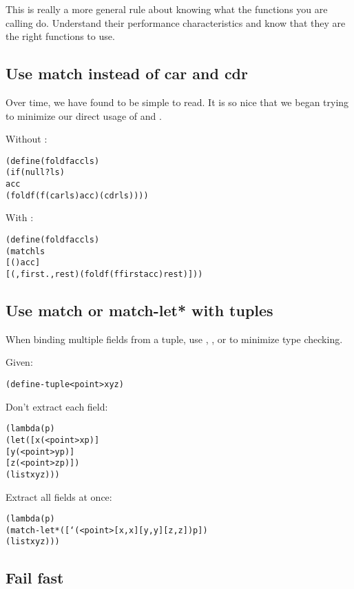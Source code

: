 \documentclass[letterpaper,11pt,twoside,final]{article}
\begin{document}
This is really a more general rule about knowing what the functions
you are calling do. Understand their performance characteristics and
know that they are the right functions to use.

\subsection* {Use match instead of car and cdr}

Over time, we have found  to be simple to read. It is
so nice that we began trying to minimize our direct usage of
 and .

Without :
\antipar
\begin{alltt}
(define (fold f acc ls)
  (if (null? ls)
      acc
      (fold f (f (car ls) acc) (cdr ls))))
\end{alltt}

With :
\antipar
\begin{alltt}
(define (fold f acc ls)
  (match ls
    [() acc]
    [(,first . ,rest) (fold f (f first acc) rest)]))
\end{alltt}

\subsection* {Use match or match-let* with tuples}

When binding multiple fields from a tuple, use ,
, or
 to minimize type checking.

Given:
\antipar
\begin{alltt}
(define-tuple <point> x y z)
\end{alltt}

Don't extract each field:
\antipar
\begin{alltt}
(lambda (p)
  (let ([x (<point> x p)]
        [y (<point> y p)]
        [z (<point> z p)])
    (list x y z)))
\end{alltt}

Extract all fields at once:
\antipar
\begin{alltt}
(lambda (p)
  (match-let* ([`(<point> [x ,x] [y ,y] [z ,z]) p])
    (list x y z)))
\end{alltt}

\subsection* {Fail fast}
\end{document}
